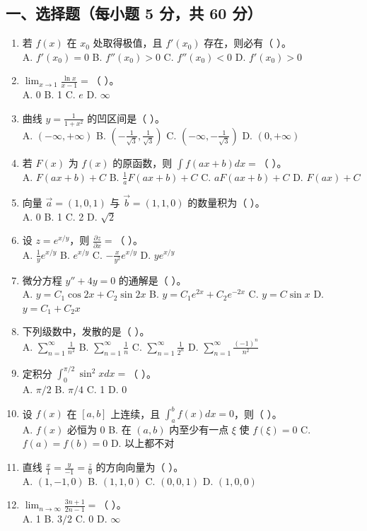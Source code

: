 \documentclass[11pt,a4paper]{article}
\begin{document}
\subsection*{一、选择题（每小题 5 分，共 60 分）}
\begin{enumerate}
    \item 若 $f(x)$ 在 $x_0$ 处取得极值，且 $f'(x_0)$ 存在，则必有（ ）。 \\
    A. $f'(x_0) = 0$ \quad B. $f''(x_0) > 0$ \quad C. $f''(x_0) < 0$ \quad D. $f'(x_0) > 0$
    \item $\lim_{x \to 1} \frac{\ln x}{x-1} = $（ ）。 \\
    A. 0 \quad B. 1 \quad C. $e$ \quad D. $\infty$
    \item 曲线 $y = \frac{1}{1+x^2}$ 的凹区间是（ ）。 \\
    A. $(-\infty, +\infty)$ \quad B. $(-\frac{1}{\sqrt{3}}, \frac{1}{\sqrt{3}})$ \quad C. $(-\infty, -\frac{1}{\sqrt{3}})$ \quad D. $(0, +\infty)$
    \item 若 $F(x)$ 为 $f(x)$ 的原函数，则 $\int f(ax+b) dx = $（ ）。 \\
    A. $F(ax+b) + C$ \quad B. $\frac{1}{a}F(ax+b) + C$ \quad C. $aF(ax+b) + C$ \quad D. $F(ax) + C$
    \item 向量 $\vec{a}=(1,0,1)$ 与 $\vec{b}=(1,1,0)$ 的数量积为（ ）。 \\
    A. 0 \quad B. 1 \quad C. 2 \quad D. $\sqrt{2}$
    \item 设 $z = e^{x/y}$，则 $\frac{\partial z}{\partial x} = $（ ）。 \\
    A. $\frac{1}{y} e^{x/y}$ \quad B. $e^{x/y}$ \quad C. $-\frac{x}{y^2} e^{x/y}$ \quad D. $y e^{x/y}$
    \item 微分方程 $y'' + 4y = 0$ 的通解是（ ）。 \\
    A. $y = C_1 \cos 2x + C_2 \sin 2x$ \quad B. $y = C_1 e^{2x} + C_2 e^{-2x}$ \quad C. $y = C \sin x$ \quad D. $y = C_1 + C_2 x$
    \item 下列级数中，发散的是（ ）。 \\
    A. $\sum_{n=1}^{\infty} \frac{1}{n^2}$ \quad B. $\sum_{n=1}^{\infty} \frac{1}{n}$ \quad C. $\sum_{n=1}^{\infty} \frac{1}{2^n}$ \quad D. $\sum_{n=1}^{\infty} \frac{(-1)^n}{n^2}$
    \item 定积分 $\int_0^{\pi/2} \sin^2 x dx = $（ ）。 \\
    A. $\pi/2$ \quad B. $\pi/4$ \quad C. 1 \quad D. 0
    \item 设 $f(x)$ 在 $[a,b]$ 上连续，且 $\int_a^b f(x) dx = 0$，则（ ）。 \\
    A. $f(x)$ 必恒为 0 \quad B. 在 $(a,b)$ 内至少有一点 $\xi$ 使 $f(\xi)=0$ \quad C. $f(a)=f(b)=0$ \quad D. 以上都不对
    \item 直线 $\frac{x}{1} = \frac{y}{-1} = \frac{z}{0}$ 的方向向量为（ ）。 \\
    A. $(1, -1, 0)$ \quad B. $(1, 1, 0)$ \quad C. $(0, 0, 1)$ \quad D. $(1, 0, 0)$
    \item $\lim_{n \to \infty} \frac{3n+1}{2n-1} = $（ ）。 \\
    A. 1 \quad B. $3/2$ \quad C. 0 \quad D. $\infty$
\end{enumerate}
\end{document}
